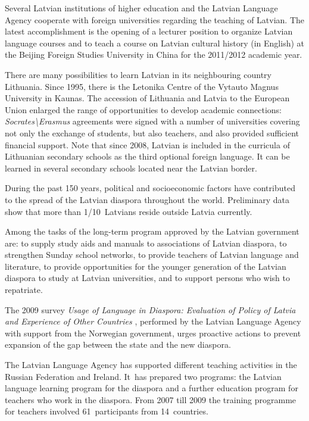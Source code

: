 \begin{multicols}{2}
Several Latvian institutions of higher education and the Latvian Language Agency cooperate with foreign universities regarding the teaching of Latvian.
The latest accomplishment is the opening of a lecturer position to organize Latvian language courses and to teach a course on Latvian cultural history (in English) at the Beijing Foreign Studies University in China for the 2011/2012 academic year.

There are many possibilities to learn Latvian in its neighbouring country Lithuania.
Since 1995, there is the Letonika Centre of the Vytauto Magnus University in Kaunas.
The accession of Lithuania and Latvia to the European Union enlarged the range of opportunities to develop academic connections: \textit{Socrates\textbackslash Erasmus} agreements were signed with a number of universities covering not only the exchange of students, but also teachers, and also provided sufficient financial support.
Note that since 2008, Latvian is included in the curricula of Lithuanian secondary schools as the third optional foreign language.
It can be learned in several secondary schools located near the Latvian border.

During the past 150 years, political and socioeconomic factors have contributed to the spread of the Latvian diaspora throughout the world.
Preliminary data show that more than 1/10~Latvians reside outside Latvia currently.

Among the tasks of the long-term program approved by the Latvian government are: to supply study aids and manuals to associations of Latvian diaspora, to strengthen Sunday school networks, to provide teachers of Latvian language and literature, to provide opportunities for the younger generation of the Latvian diaspora to study at Latvian universities, and to support persons who wish to repatriate.

The 2009 survey \textit{Usage of Language in Diaspora: Evaluation of Policy of Latvia and Experience of Other Countries} \cite{Meta4}, performed by the Latvian Language Agency with support from the Norwegian government, urges proactive actions to prevent expansion of the gap between the state and the new diaspora.

The Latvian Language Agency has supported different teaching activities in the Russian Federation and Ireland.
It~has prepared two programs: the Latvian language learning program for the diaspora and a further education program for teachers who work in the diaspora.
From 2007 till 2009 the training programme for teachers involved 61~participants from 14~countries.


\end{multicols}
